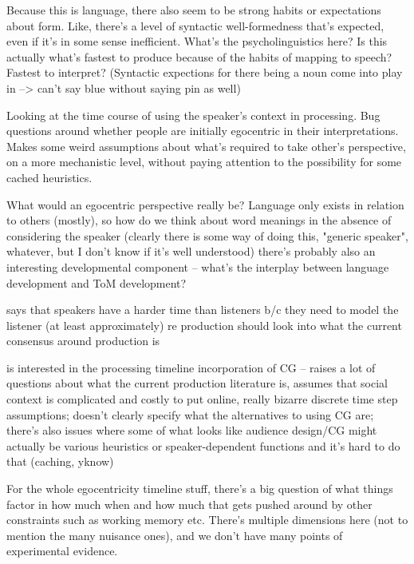\documentclass[]{article}
\begin{document}
Because this is language, there also seem to be strong habits or expectations about form. Like, there's a level of syntactic well-formedness that's expected, even if it's in some sense inefficient. What's the psycholinguistics here? Is this actually what's fastest to produce because of the habits of mapping to speech? Fastest to interpret? (Syntactic expections for there being a noun come into play in \cite{degen20200406} --> can't say blue without saying pin as well) 

\cite{hanna2003} Looking at the time course of using the speaker's context in processing. Bug questions around whether people are initially egocentric in their interpretations. Makes some weird assumptions about what's required to take other's perspective, on a more mechanistic level, without paying attention to the possibility for some cached heuristics. 

What would an egocentric perspective really be? Language only exists in relation to others (mostly), so how do we think about word meanings in the absence of considering the speaker (clearly there is some way of doing this, "generic speaker", whatever, but I don't know if it's well understood) there's probably also an interesting developmental component -- what's the interplay between language development and ToM development? 



\cite{heller2012} says that speakers have a harder time than listeners b/c they need to model the listener (at least approximately) 
re production should look into what the current consensus around production is 


\cite{horton1996} is interested in the processing timeline incorporation of CG -- raises a lot of questions about what the current production literature is, assumes that social context is complicated and costly to put online, really bizarre discrete time step assumptions; doesn't clearly specify what the alternatives to using CG are; there's also issues where some of what looks like audience design/CG might actually be various heuristics or speaker-dependent functions and it's hard to do that (caching, yknow) 

For the whole egocentricity timeline stuff, there's a big question of what things factor in how much when and how much that gets pushed around by other constraints such as working memory etc. There's multiple dimensions here (not to mention the many nuisance ones), and we don't have many points of experimental evidence. 
\end{document}
